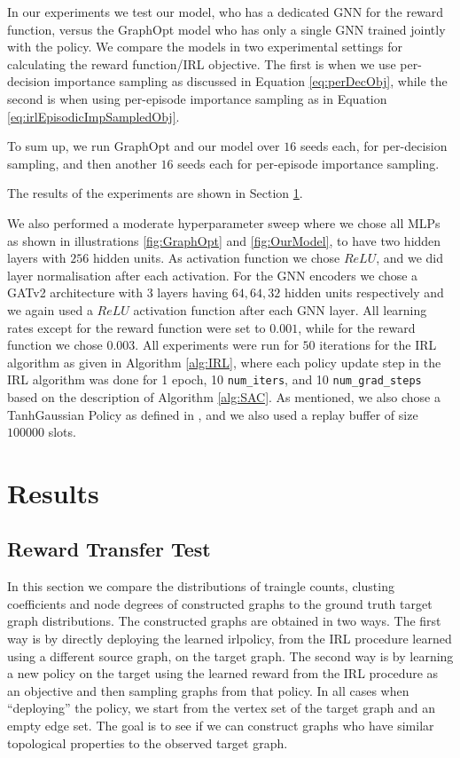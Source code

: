 \documentclass{report}
\numberwithin{equation}{section}
\numberwithin{figure}{section}
\numberwithin{table}{section}
\numberwithin{algorithm}{section}
\begin{document}
In our experiments we test our model, who has a dedicated 
GNN for the reward function, versus the GraphOpt \citep{GraphOpt}
model who has only a single GNN trained jointly with the policy. 
We compare the models in two experimental settings 
for calculating the reward function/IRL objective. The first 
is when we use per-decision importance sampling as discussed in 
Equation \ref{eq:perDecObj}, while the second is when using 
per-episode importance sampling as in Equation \ref{eq:irlEpisodicImpSampledObj}.

To sum up, we run GraphOpt and our model over $16$ seeds each, for 
per-decision sampling, and then another $16$ seeds each for 
per-episode importance sampling. 

The results of the experiments are shown in Section \ref{sec:results}.

We also performed a moderate hyperparameter sweep where we chose 
all MLPs as shown in illustrations \ref{fig:GraphOpt} and 
\ref{fig:OurModel}, to have two hidden layers with $256$ hidden units. 
As activation function we chose $ReLU$, and we did layer normalisation 
after each activation. For the GNN encoders we chose a GATv2 architecture 
\citep{GATv2} with 3 layers having $64,64,32$ hidden units respectively 
and we again used a $ReLU$ activation function after each GNN layer. 
All learning rates except for the reward function were set to $0.001$, 
while for the reward function we chose $0.003$. All experiments 
were run for $50$ iterations for the IRL algorithm as given in 
Algorithm \ref{alg:IRL}, where each policy update step in the 
IRL algorithm was done for 1 epoch, 10 \verb|num_iters|, and 10 \verb|num_grad_steps| 
based on the description of Algorithm \ref{alg:SAC}. As mentioned, 
we also chose a TanhGaussian Policy as defined in \cite{SAC2}, and 
we also used a replay buffer of size $100000$ slots.


\section{Results}\label{sec:results}

\subsection{Reward Transfer Test}

In this section we compare the distributions of traingle 
counts, clusting coefficients and node degrees of 
constructed graphs to the ground truth 
target graph distributions. The constructed graphs 
are obtained in two ways. The first way is by 
directly deploying the 
learned irlpolicy, from the IRL procedure learned 
using a different source graph,
on the target graph. The second way is by learning a new policy 
on the target using the learned reward from the IRL 
procedure as an objective and then 
sampling graphs from that policy. In all cases when ``deploying'' 
the policy, we start from the vertex set of the target graph 
and an empty edge set. The goal is to see if we can construct 
graphs who have similar topological properties to the 
observed target graph.
\end{document}
